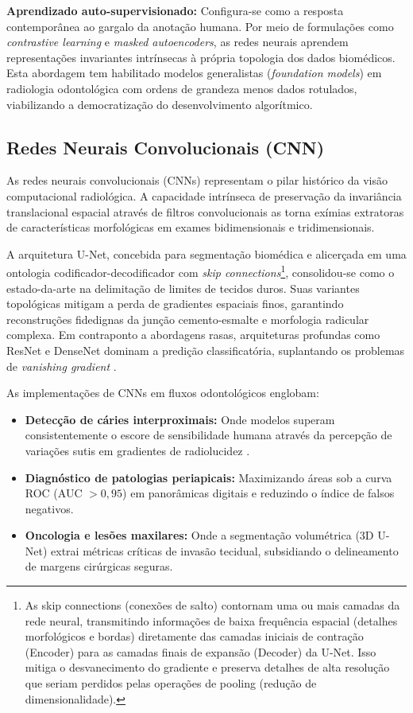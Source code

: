\textbf{Aprendizado auto-supervisionado:} Configura-se como a resposta contemporânea ao gargalo da anotação humana. Por meio de formulações como \textit{contrastive learning} e \textit{masked autoencoders}, as redes neurais aprendem representações invariantes intrínsecas à própria topologia dos dados biomédicos. Esta abordagem tem habilitado modelos generalistas (\textit{foundation models}) em radiologia odontológica com ordens de grandeza menos dados rotulados, viabilizando a democratização do desenvolvimento algorítmico.

\subsection{Redes Neurais Convolucionais (CNN)}
\label{subsec:cnn}

As redes neurais convolucionais (CNNs) representam o pilar histórico da visão computacional radiológica. A capacidade intrínseca de preservação da invariância translacional espacial através de filtros convolucionais as torna exímias extratoras de características morfológicas em exames bidimensionais e tridimensionais. 

A arquitetura U-Net, concebida para segmentação biomédica e alicerçada em uma ontologia codificador-decodificador com \textit{skip connections}\footnote{As skip connections (conexões de salto) contornam uma ou mais camadas da rede neural, transmitindo informações de baixa frequência espacial (detalhes morfológicos e bordas) diretamente das camadas iniciais de contração (Encoder) para as camadas finais de expansão (Decoder) da U-Net. Isso mitiga o desvanecimento do gradiente e preserva detalhes de alta resolução que seriam perdidos pelas operações de pooling (redução de dimensionalidade).}, consolidou-se como o estado-da-arte na delimitação de limites de tecidos duros. Suas variantes topológicas mitigam a perda de gradientes espaciais finos, garantindo reconstruções fidedignas da junção cemento-esmalte e morfologia radicular complexa. Em contraponto a abordagens rasas, arquiteturas profundas como ResNet e DenseNet dominam a predição classificatória, suplantando os problemas de \textit{vanishing gradient} \cite{naturebdj2026}.

As implementações de CNNs em fluxos odontológicos englobam:
\begin{itemize}
\item \textbf{Detecção de cáries interproximais:} Onde modelos superam consistentemente o escore de sensibilidade humana através da percepção de variações sutis em gradientes de radiolucidez \cite{elsaid2025digital}.
\item \textbf{Diagnóstico de patologias periapicais:} Maximizando áreas sob a curva ROC (AUC $> 0,95$) em panorâmicas digitais e reduzindo o índice de falsos negativos.
\item \textbf{Oncologia e lesões maxilares:} Onde a segmentação volumétrica (3D U-Net) extrai métricas críticas de invasão tecidual, subsidiando o delineamento de margens cirúrgicas seguras.
\end{itemize}

